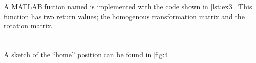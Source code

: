\documentclass[a4paper]{scrartcl}
\begin{document}
\section{}
A MATLAB fuction named  is implemented with the code shown in \autoref{lst:ex3}. This function has two return values; the homogenous transformation matrix and the rotation matrix. 


\section{} %
A sketch of the ``home'' position can be found in \autoref{fig:4}.
\end{document}
